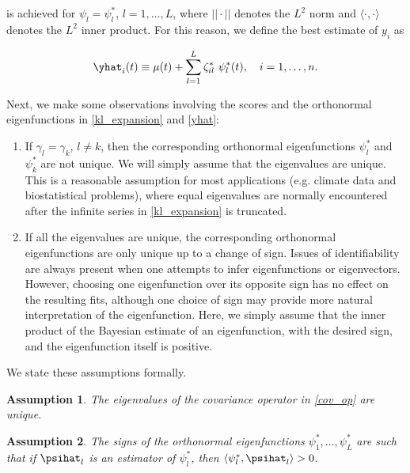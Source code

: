 \documentclass[12pt]{article}
\theoremstyle{plain}
\newtheorem{assumption}{Assumption}
\theoremstyle{definition}
\theoremstyle{remark}
\begin{document}
\noindent is achieved for $\psi_l = \psi^*_l$, $l = 1, \dots, L$, where $|| \cdot ||$ denotes the $L^2$ norm and
$\langle \cdot, \cdot \rangle$ denotes the $L^2$ inner product. For this reason, we define the best estimate of
$y_i$ as

\begin{equation}
	\yhat_i (t) \equiv \mu (t) + \sum_{l=1}^L \zeta^*_{il} \ \psi^*_l (t), \quad i = 1, \dots, n.
\label{yhat}
\end{equation}

Next, we make some observations involving the scores and the orthonormal eigenfunctions in \eqref{kl_expansion}
and \eqref{yhat}:

\begin{enumerate}
	\item If $\gamma_l = \gamma_k$, $l \neq k$, then the corresponding orthonormal
	eigenfunctions $\psi^*_l$ and $\psi^*_k$
	are not unique. We will simply assume that the eigenvalues are unique. This is a reasonable assumption
	for most applications (e.g. climate data
	and biostatistical problems), where equal eigenvalues are normally encountered after the infinite series
	in \eqref{kl_expansion} is truncated.
	\item If all the eigenvalues are unique, the corresponding orthonormal eigenfunctions are only unique up to
	a change of sign. Issues of identifiability are always present when one attempts to infer eigenfunctions or
	eigenvectors. However, choosing one eigenfunction over its opposite sign has no effect on the resulting fits,
	although one choice of sign may provide more natural interpretation of the eigenfunction.
	Here, we simply assume that the inner product of the Bayesian estimate of an
	eigenfunction, with the desired sign, and the eigenfunction itself is positive.
\end{enumerate}

\noindent We state these assumptions formally.

\begin{assumption}
	
	The eigenvalues of the covariance operator in \eqref{cov_op} are unique.
	
\label{asspn:scores}
\end{assumption}

\begin{assumption}
	
	The signs of the orthonormal eigenfunctions $\psi^*_1, \dots, \psi^*_L$ are such that if $\psihat_l$ is an
	estimator of $\psi^*_l$, then $\langle \psi^*_l , \psihat_l \rangle > 0$.
	
\label{asspn:signs}
\end{assumption}
\end{document}

